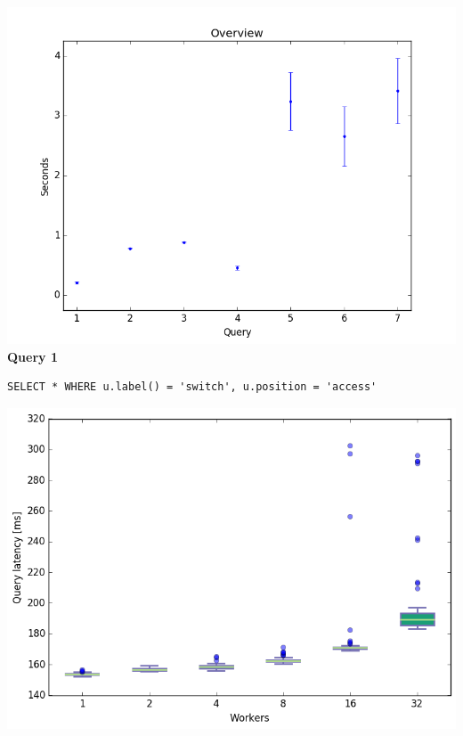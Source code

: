 \documentclass[11pt,singlecolumn]{scrartcl}
\begin{document}
\includegraphics[width=1\textwidth]{overview}
\textbf{Query 1}\\
\begin{verbatim}
SELECT * WHERE u.label() = 'switch', u.position = 'access'
\end{verbatim}
\includegraphics[width=1\textwidth]{box/q1}
\end{document}
